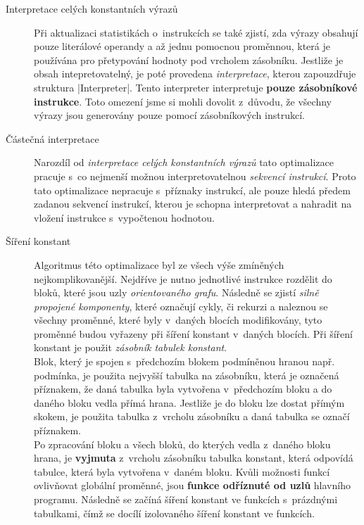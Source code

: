 \begin{description}
    \item[Interpretace celých konstantních výrazů] Při aktualizaci statistikách o~instrukcích se také zjistí, zda výrazy obsahují pouze literálové operandy a až jednu pomocnou proměnnou, která je používána pro přetypování hodnoty pod vrcholem zásobníku. Jestliže je obsah intepretovatelný, je poté provedena \emph{interpretace}, kterou zapouzdřuje struktura \ic|Interpreter|. Tento interpreter interpretuje \textbf{pouze zásobníkové instrukce}. Toto omezení jsme si mohli dovolit z~důvodu, že všechny výrazy jsou generovány pouze pomocí zásobníkových instrukcí.
    
    \item[Částečná interpretace] Narozdíl od \emph{interpretace celých konstantních výrazů} tato optimalizace pracuje s~co nejmenší možnou interpretovatelnou \emph{sekvencí instrukcí}. Proto tato optimalizace nepracuje s~příznaky instrukcí, ale pouze hledá předem zadanou sekvencí instrukcí, kterou je schopna interpretovat a nahradit na vložení instrukce s~vypočtenou hodnotou.
    
    \item[Šíření konstant] Algoritmus této optimalizace byl ze všech výše zmíněných nejkomplikovanější. Nejdříve je nutno jednotlivé instrukce rozdělit do bloků, které jsou uzly \emph{orientovaného grafu}. Následně se zjistí \emph{silně propojené komponenty}, které označují cykly, či rekurzi a naleznou se všechny proměnné, které byly v~daných blocích modifikovány, tyto proměnné budou vyřazeny při šíření konstant v~daných blocích. Při šíření konstant je použit \emph{zásobník tabulek konstant}. \\Blok, který je spojen s~předchozím blokem podmíněnou hranou např. podmínka, je použita nejvyšší tabulka na zásobníku, která je označená příznakem, že daná tabulka byla vytvořena v~předchozím bloku a do daného bloku vedla přímá hrana. Jestliže je do bloku lze dostat přímým skokem, je použita tabulka z~vrcholu zásobníku a daná tabulka se označí příznakem. \\Po zpracování bloku a všech bloků, do kterých vedla z~daného bloku hrana, je \textbf{vyjmuta} z~vrcholu zásobníku tabulka konstant, která odpovídá tabulce, která byla vytvořena v~daném bloku. Kvůli možnosti funkcí ovlivňovat globální proměnné, jsou \textbf{funkce odříznuté od uzlů} hlavního programu. Následně se začíná šíření konstant ve funkcích s~prázdnými tabulkami, čímž se docílí izolovaného šíření konstant ve funkcích.
\end{description}

